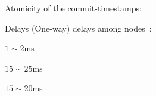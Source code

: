 \begin{frame}{}
  \begin{center}
    \begin{minipage}{1.0\textwidth}
      
    \end{minipage}
  \end{center}
\end{frame}

\begin{frame}{}
  \begin{center}
    \begin{minipage}{1.0\textwidth}
      
    \end{minipage}
  \end{center}
\end{frame}

\begin{frame}{}
  \begin{center}
  \end{center}
\end{frame}

\begin{frame}{}
  \begin{center}
    \begin{minipage}{1.0\textwidth}
      
    \end{minipage}
  \end{center}
\end{frame}

\begin{frame}{}
  Atomicity of the commit-timestamps:

\end{frame}

\begin{frame}{Delays}
  (One-way) delays among nodes~\footnotemark:
  \begin{description}
    \item[Within datacenter:] $1 \sim 2$ms
    \item[Across datacenters:] $15 \sim 25$ms
    \item[Clients to nodes:] $15 \sim 20$ms
  \end{description}

\end{frame}

